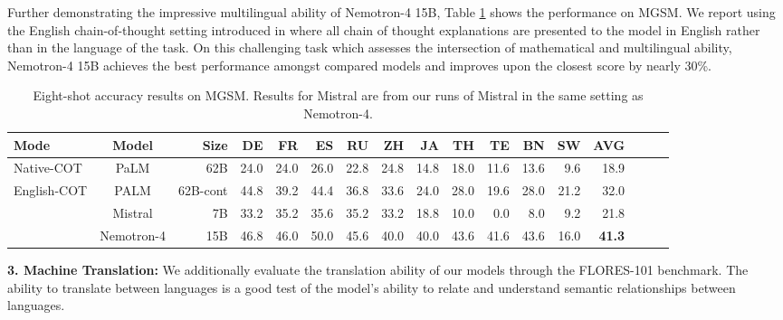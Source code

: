 \documentclass[11pt]{article}
\newcommand{\shrimai}[1]{{\color{red}{\textbf{Shrimai}: #1}}}
\newcommand{\ours}{Nemotron-4}
\begin{document}
Further demonstrating the impressive multilingual ability of \ours{} 15B, Table \ref{tab:mgsm_all} shows the performance on MGSM. 
We report using the English chain-of-thought setting introduced in \citep{shi2022language} where all chain of thought explanations are presented to the model in English rather than in the language of the task. On this challenging task which assesses the intersection of mathematical and multilingual ability, \ours{} 15B achieves the best performance amongst compared models and improves upon the closest score by nearly 30\%.





\begin{table}[H]
\centering
\begin{adjustbox}{max width=\textwidth, scale=1.0}
\begin{tabular}{lcrrrrrrrrrrrrrrr}
\toprule
Mode & Model & Size & DE & FR & ES & RU & ZH & JA & TH & TE & BN & SW & AVG  \\
\midrule
 \multirow{1}{*}{Native-COT}  & \multirow{1}{*}{PaLM} 
 &   62B 	&24.0  &	24.0 &	26.0 &	22.8 &	24.8	& 14.8 & 18.0 & 11.6 &	13.6 & 9.6&	18.9	\\
\midrule
\multirow{3}{*}{English-COT} & \multirow{1}{*}{PALM} & 62B-cont & 44.8 & 39.2 & 44.4 & 36.8 & 33.6 & 24.0 & 28.0 & 19.6 & 28.0 & 21.2 & 32.0 \\
& \multirow{1}{*}{Mistral} & 7B & 33.2 & 35.2 & 35.6 & 35.2 & 33.2 & 18.8 & 10.0 & 0.0 & 8.0 & 9.2 & 21.8 \\
& \multirow{1}{*}{\ours{}} & 15B & 46.8 & 46.0 & 50.0&45.6&40.0&40.0&43.6&41.6&43.6&16.0 & \textbf{41.3} \\
\bottomrule
\end{tabular}
\end{adjustbox}
\caption{\label{tab:mgsm_all} Eight-shot accuracy results on MGSM. Results for Mistral are from our runs of Mistral in the same setting as \ours{}. }
\end{table}

\textbf{3. Machine Translation:} We additionally evaluate the translation ability of our models through the FLORES-101 \citep{goyal2021} benchmark. The ability to translate between languages is a good test of the model's ability to relate and understand semantic relationships between languages.
\end{document}
